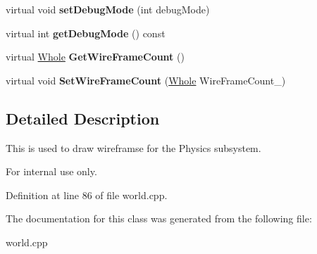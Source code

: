 \begin{DoxyCompactItemize}
\item 
\hypertarget{classphys_1_1debug_1_1InternalDebugDrawer_a63059b273ed6031a393b2d994b820bcc}{
virtual void {\bfseries setDebugMode} (int debugMode)}
\label{db/d27/classphys_1_1debug_1_1InternalDebugDrawer_a63059b273ed6031a393b2d994b820bcc}

\item 
\hypertarget{classphys_1_1debug_1_1InternalDebugDrawer_aba329861569d741e970ce5aafb668e84}{
virtual int {\bfseries getDebugMode} () const }
\label{db/d27/classphys_1_1debug_1_1InternalDebugDrawer_aba329861569d741e970ce5aafb668e84}

\item 
\hypertarget{classphys_1_1debug_1_1InternalDebugDrawer_aa1666e636e6ff81813c0b1a85d7bc157}{
virtual \hyperlink{namespacephys_a460f6bc24c8dd347b05e0366ae34f34a}{Whole} {\bfseries GetWireFrameCount} ()}
\label{db/d27/classphys_1_1debug_1_1InternalDebugDrawer_aa1666e636e6ff81813c0b1a85d7bc157}

\item 
\hypertarget{classphys_1_1debug_1_1InternalDebugDrawer_a76922fda7bb3b59d301e50d67e4f3c72}{
virtual void {\bfseries SetWireFrameCount} (\hyperlink{namespacephys_a460f6bc24c8dd347b05e0366ae34f34a}{Whole} WireFrameCount\_\-)}
\label{db/d27/classphys_1_1debug_1_1InternalDebugDrawer_a76922fda7bb3b59d301e50d67e4f3c72}

\end{DoxyCompactItemize}


\subsection{Detailed Description}
This is used to draw wireframse for the Physics subsystem. \begin{DoxyInternal}{For internal use only.}
\end{DoxyInternal}


Definition at line 86 of file world.cpp.



The documentation for this class was generated from the following file:\begin{DoxyCompactItemize}
\item 
world.cpp\end{DoxyCompactItemize}
